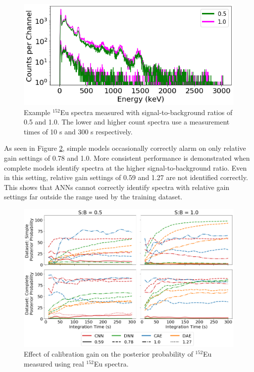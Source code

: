 \begin{figure}[H]
	\centering
	\includegraphics[width=0.85\linewidth]{images/realspectra-cal-eu152-spec}
	\caption{Example $^{152}$Eu spectra measured with signal-to-background ratios of 0.5 and 1.0. The lower and higher count spectra use a measurement times of 10 s and 300 s respectively.}
	\label{fig:realspectra-cal-eu152-spec}
\end{figure}

As seen in Figure \ref{fig:realspectra-cal-eu152}, simple models occasionally correctly alarm on only relative gain settings of 0.78 and 1.0. More consistent performance is demonstrated when complete models identify spectra at the higher signal-to-background ratio. Even in this setting, relative gain settings of 0.59 and 1.27 are not identified correctly. This shows that ANNs cannot correctly identify spectra with relative gain settings far outside the range used by the training dataset.


\begin{figure}[H]
	\centering
	\includegraphics[width=1.0\linewidth]{images/realspectra-cal-eu152}
	\caption{Effect of calibration gain on the posterior probability of $^{152}$Eu measured using real $^{152}$Eu spectra.}
	\label{fig:realspectra-cal-eu152}
\end{figure}

